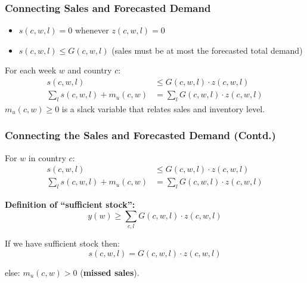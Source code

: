 \documentclass[xcolor=table]{beamer}
\begin{document}
\begin{frame}[t]
\frametitle{Connecting Sales and Forecasted Demand}
  \begin{itemize}
    \item $s(c, w, l) = 0$ whenever $z(c, w, l) = 0$
    \item $s(c, w, l) \leq G(c, w, l)$ (sales must be at most the forecasted total demand)
    \end{itemize}

  For each week $w$ and country $c$:
    \begin{align*}
     s(c, w, l) & \leq G(c, w, l) \cdot z(c, w, l) \\
      \sum_{l} s(c, w, l) + m_u(c, w) & = \sum_{l} G(c, w, l) \cdot z(c, w, l)
    \end{align*}
  $m_u(c, w) \geq 0$ is a slack variable that relates sales and inventory
  level.
\end{frame}


\begin{frame}[t]
  \frametitle{Connecting the Sales and Forecasted Demand (Contd.)}
For $w$ in country $c$:
\begin{align*}
  s(c, w, l) & \leq G(c, w, l) \cdot z(c, w, l) \\
    \sum_{l} s(c, w, l) + m_u(c, w) & = \sum_{l} G(c, w, l) \cdot z(c, w, l)
\end{align*}

\textcolor{orange2}{\textbf{Definition of ``sufficient stock'':}}
\[y(w) \geq \sum_{c, l} G(c, w, l) \cdot z(c, w, l)\]

If we have sufficient stock then: 
  \[s(c, w, l) = G(c, w, l) \cdot z(c, w, l)\]

  else: $m_u(c, w) > 0$ (\textcolor{orange2}{\textbf{missed sales}}).
\end{frame}
\end{document}
